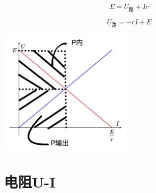 \documentclass[10pt,cn]{elegantbook}
\newcounter{num}
\begin{document}
$$E=U_{\text{路}}+Ir$$

$$U_{\text{路}}=-rI+E$$

\begin{center}
	\includegraphics[max width=0.5\textwidth]{image/20240910-2.jpg}
\end{center}


\section{电阻U-I}
\end{document}
